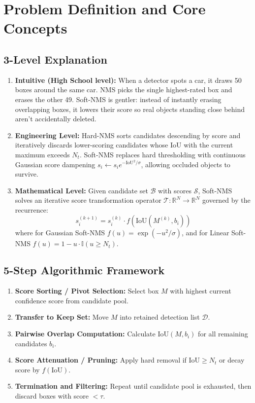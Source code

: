 \documentclass[11pt,a4paper]{article}
\theoremstyle{definition}
\begin{document}
\section{Problem Definition and Core Concepts}

\subsection{3-Level Explanation}
\begin{enumerate}
    \item \textbf{Intuitive (High School level):} When a detector spots a car, it draws 50 boxes around the same car. NMS picks the single highest-rated box and erases the other 49. Soft-NMS is gentler: instead of instantly erasing overlapping boxes, it lowers their score so real objects standing close behind aren't accidentally deleted.
    \item \textbf{Engineering Level:} Hard-NMS sorts candidates descending by score and iteratively discards lower-scoring candidates whose IoU with the current maximum exceeds $N_t$. Soft-NMS replaces hard thresholding with continuous Gaussian score dampening $s_i \gets s_i e^{-\text{IoU}^2/\sigma}$, allowing occluded objects to survive.
    \item \textbf{Mathematical Level:} Given candidate set $\mathcal{B}$ with scores $\mathcal{S}$, Soft-NMS solves an iterative score transformation operator $\mathcal{T}: \mathbb{R}^N \to \mathbb{R}^N$ governed by the recurrence:
    \begin{equation}
    s_i^{(k+1)} = s_i^{(k)} \cdot f(\text{IoU}(M^{(k)}, b_i))
    \end{equation}
    where for Gaussian Soft-NMS $f(u) = \exp(-u^2 / \sigma)$, and for Linear Soft-NMS $f(u) = 1 - u \cdot \mathbb{I}(u \ge N_t)$.
\end{enumerate}

\subsection{5-Step Algorithmic Framework}
\begin{enumerate}
    \item \textbf{Score Sorting / Pivot Selection:} Select box $M$ with highest current confidence score from candidate pool.
    \item \textbf{Transfer to Keep Set:} Move $M$ into retained detection list $\mathcal{D}$.
    \item \textbf{Pairwise Overlap Computation:} Calculate $\text{IoU}(M, b_i)$ for all remaining candidates $b_i$.
    \item \textbf{Score Attenuation / Pruning:} Apply hard removal if $\text{IoU} \ge N_t$ or decay score by $f(\text{IoU})$.
    \item \textbf{Termination and Filtering:} Repeat until candidate pool is exhausted, then discard boxes with score $< \tau$.
\end{enumerate}
\end{document}

